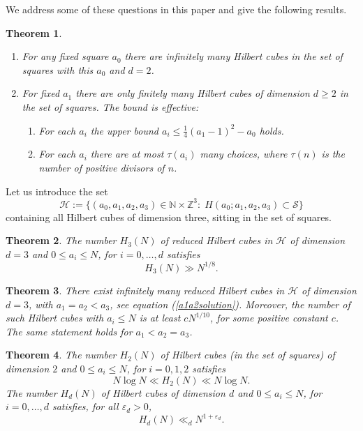 \documentclass[10pt]{amsart}
\theoremstyle{plain}
\newtheorem{thm}{Theorem}[section]
\def\cal{\mathcal}
\def\bbb{\mathbb}
\newcommand{\N}{\bbb{N}}
\newcommand{\Z}{\bbb{Z}}
\begin{document}
We address some of these questions in this paper and give the following 
results.

\begin{thm}{\label{thm:finite}}
\begin{enumerate}
\item  For any fixed square $a_0$ there are infinitely many Hilbert cubes in the set of squares with this $a_0$ and $d=2$.
\item For fixed $a_1$ there are only finitely many Hilbert cubes of 
dimension $d \geq 2$ in the set of squares. The bound is effective:
\begin{enumerate}
\item
For each $a_i$ the upper bound $a_i\leq \frac{1}{4}(a_1-1)^2-a_0$ holds.
\item
For each $a_i$ there are at most $\tau(a_i)$ many choices, where $\tau(n)$ is the number of positive divisors of $n$.
\end{enumerate}
\end{enumerate}
\end{thm}

Let us introduce the set
$$
\cal{H}:=\{(a_{0}, a_{1},a_{2},a_{3})\in\N\times \Z^{3}:\;H(a_{0}; a_{1}, a_{2}, a_{3})\subset \cal{S}\}
$$
containing all Hilbert cubes of dimension three, sitting in the set of squares.
\begin{thm}{\label{thm:H3}}
The number $H_3(N)$ of reduced Hilbert cubes in $\cal{H}$
of dimension $d=3$ and $0\leq a_i\leq N$, for $i=0, \ldots, d$ satisfies
$$
H_3(N)\gg N^{1/8}.
$$
\end{thm}


\begin{thm}{\label{thm:idenical base}}
There exist infinitely many reduced Hilbert cubes in ${\cal H}$  of dimension $d=3$, with
$a_1=a_2<a_3$,    see equation (\ref{a1a2solution}). 
Moreover, the number of such Hilbert cubes with $a_i \leq N$ 
is at least $cN^{1/10}$, for some positive constant $c$.
The same statement holds for $a_1<a_2=a_3$.

\end{thm}


\begin{thm}{\label{thm:H_d-upper-bound}}
The number $H_2(N)$ of Hilbert cubes (in the set of squares) 
of dimension $2$ and $0\leq a_i\leq N$, for $i=0,1,2$ satisfies
\[N\log N \ll H_2(N) \ll N\log N.\]
The number $H_d(N)$ of Hilbert cubes of dimension $d$ and $0\leq a_i\leq N$, for $i=0, \ldots, d$ satisfies, for all $\varepsilon_d>0$,
\[H_d(N) \ll_d N^{1+\varepsilon_d}.\]
\end{thm}
\end{document}
